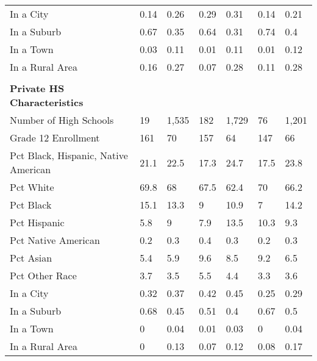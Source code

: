 \begin{longtabu}{X[4.5,l] X[1,c] X[1,c] X[1,c] X[1,c] X[1,c] X[1,c]}
\hspace{0.4cm}In a City&0.14&0.26&0.29&0.31&0.14&0.21\\%
\hspace{0.4cm}In a Suburb&0.67&0.35&0.64&0.31&0.74&0.4\\%
\hspace{0.4cm}In a Town&0.03&0.11&0.01&0.11&0.01&0.12\\%
\hspace{0.4cm}In a Rural Area&0.16&0.27&0.07&0.28&0.11&0.28\\%
&&&&&&\\%
\textbf{Private HS Characteristics}&\textbf{}&\textbf{}&\textbf{}&\textbf{}&\textbf{}&\textbf{}\\%
\hspace{0.4cm}Number of High Schools&19&1,535&182&1,729&76&1,201\\%
\hspace{0.4cm}Grade 12 Enrollment&161&70&157&64&147&66\\%
\hspace{0.4cm}Pct Black, Hispanic, Native American&21.1&22.5&17.3&24.7&17.5&23.8\\%
\hspace{0.4cm}Pct White&69.8&68&67.5&62.4&70&66.2\\%
\hspace{0.4cm}Pct Black&15.1&13.3&9&10.9&7&14.2\\%
\hspace{0.4cm}Pct Hispanic&5.8&9&7.9&13.5&10.3&9.3\\%
\hspace{0.4cm}Pct Native American&0.2&0.3&0.4&0.3&0.2&0.3\\%
\hspace{0.4cm}Pct Asian&5.4&5.9&9.6&8.5&9.2&6.5\\%
\hspace{0.4cm}Pct Other Race&3.7&3.5&5.5&4.4&3.3&3.6\\%
\hspace{0.4cm}In a City&0.32&0.37&0.42&0.45&0.25&0.29\\%
\hspace{0.4cm}In a Suburb&0.68&0.45&0.51&0.4&0.67&0.5\\%
\hspace{0.4cm}In a Town&0&0.04&0.01&0.03&0&0.04\\%
\hspace{0.4cm}In a Rural Area&0&0.13&0.07&0.12&0.08&0.17\\%
\end{longtabu}
